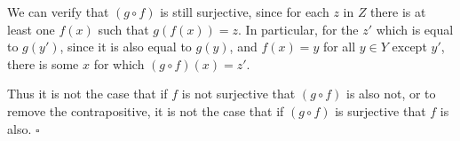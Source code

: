 \documentclass[../../main.tex]{subfiles}
\begin{document}
\begin{enumerate}
\begin{prf}
    We can verify that $(g \circ f)$ is still surjective, since for each $z$ in $Z$ there is at least one $f(x)$ such that $g(f(x))=z$.
    In particular, for the $z'$ which is equal to $g(y')$, since it is also equal to $g(y)$, and $f(x)=y$ for all $y \in Y$ except $y'$, there is some $x$ for which $(g \circ f)(x)=z'$.

    Thus it is not the case that if $f$ is not surjective that $(g \circ f)$ is also not, or to remove the contrapositive, it is not the case that if $(g \circ f)$ is surjective that $f$ is also.
    $\square$
\end{prf}
\end{enumerate}

\addtocounter{subsection}{2}
\subsection{}
\end{document}
